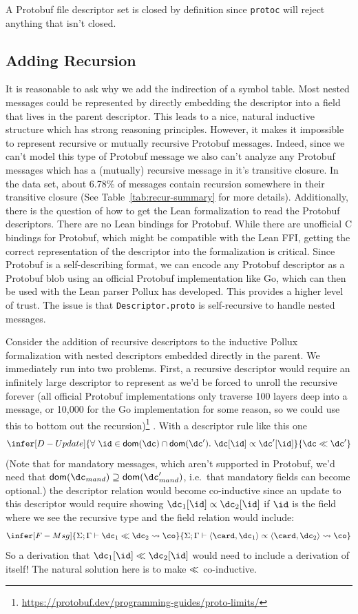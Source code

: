 A Protobuf file descriptor set is closed by definition since \texttt{protoc}
will reject anything that isn't closed.

\subsection{Adding Recursion}\label{sec:recursive-types}

It is reasonable to ask why we add the indirection of a symbol table. Most
nested messages could be represented by directly embedding the descriptor into a
field that lives in the parent descriptor. This leads to a nice, natural
inductive structure which has strong reasoning principles. However, it makes it
impossible to represent recursive or mutually recursive Protobuf
messages. Indeed, since we can't model this type of Protobuf message we also
can't analyze any Protobuf messages which has a (mutually) recursive message in
it's transitive closure. In the data set, about 6.78\% of messages contain
recursion somewhere in their transitive closure (See
Table~\ref{tab:recur-summary} for more details). Additionally, there is the
question of how to get the Lean formalization to read the Protobuf
descriptors. There are no Lean bindings for Protobuf. While there are unofficial
C bindings for Protobuf, which might be compatible with the Lean FFI, getting
the correct representation of the descriptor into the formalization is
critical. Since Protobuf is a self-describing format, we can encode any Protobuf
descriptor as a Protobuf blob using an official Protobuf implementation like Go,
which can then be used with the Lean parser Pollux has developed. This provides
a higher level of trust. The issue is that \texttt{Descriptor.proto} is
self-recursive to handle nested messages.

Consider the addition of recursive descriptors to the inductive Pollux
formalization with nested descriptors embedded directly in the parent. We
immediately run into two problems. First, a recursive descriptor would require
an infinitely large descriptor to represent as we'd be forced to unroll the
recursive forever (all official Protobuf implementations only traverse 100
layers deep into a message, or 10,000 for the Go implementation for some reason,
so we could use this to bottom out the
recursion)\footnote{\url{https://protobuf.dev/programming-guides/proto-limits/}}
. With a descriptor rule like this one
\[
  \infer[D-Update]{ \forall\ \id \in \dom{\dc} \cap \dom{\dc'}.\ \dc[\id] \fieldrel \dc'[\id] }{ \dc \dcompat \dc' }
\]
(Note that for mandatory messages, which aren't supported in Protobuf, we'd need
that $\dom{\dc_{mand}} \supseteq \dom{\dc_{mand}'}$, i.e.\ that mandatory fields can
become optional.) the descriptor relation would become co-inductive since an
update to this descriptor would require showing $\dc_1[\id] \fieldrel \dc_2[\id]$ if
$\id$ is the field where we see the recursive type and the field relation would
include:
\[ \infer[F-Msg]{ \judg{\Gamma}{\dc_1 \dcompat \dc_2 \coerce \co} }{
    \judg{\Gamma}{\field{\card}{\dc_1} \fieldrel \field{\card}{\dc_2} \coerce \co
    }} \] So a derivation that $\dc_1[\id] \dcompat \dc_2[\id]$ would need to
include a derivation of itself! The natural solution here is to make $\ll$
co-inductive.

